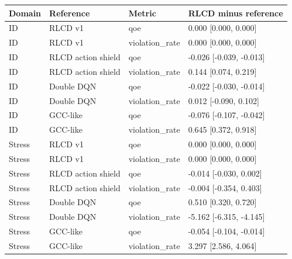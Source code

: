 \begin{tabular}{llll}
\toprule
Domain & Reference & Metric & RLCD minus reference \\
\midrule
ID & RLCD v1 & qoe & 0.000 [0.000, 0.000] \\
ID & RLCD v1 & violation\_rate & 0.000 [0.000, 0.000] \\
ID & RLCD action shield & qoe & -0.026 [-0.039, -0.013] \\
ID & RLCD action shield & violation\_rate & 0.144 [0.074, 0.219] \\
ID & Double DQN & qoe & -0.022 [-0.030, -0.014] \\
ID & Double DQN & violation\_rate & 0.012 [-0.090, 0.102] \\
ID & GCC-like & qoe & -0.076 [-0.107, -0.042] \\
ID & GCC-like & violation\_rate & 0.645 [0.372, 0.918] \\
Stress & RLCD v1 & qoe & 0.000 [0.000, 0.000] \\
Stress & RLCD v1 & violation\_rate & 0.000 [0.000, 0.000] \\
Stress & RLCD action shield & qoe & -0.014 [-0.030, 0.002] \\
Stress & RLCD action shield & violation\_rate & -0.004 [-0.354, 0.403] \\
Stress & Double DQN & qoe & 0.510 [0.320, 0.720] \\
Stress & Double DQN & violation\_rate & -5.162 [-6.315, -4.145] \\
Stress & GCC-like & qoe & -0.054 [-0.104, -0.014] \\
Stress & GCC-like & violation\_rate & 3.297 [2.586, 4.064] \\
\bottomrule
\end{tabular}
